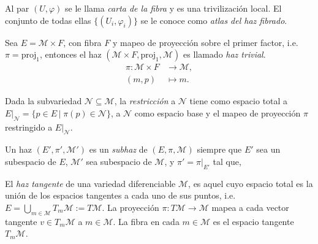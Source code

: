 \begin{mydef}  \cite{Baez}
Al par $(U, \varphi)$ se le llama \emph{carta de la fibra} y es una trivilizaci\'{o}n local. El conjunto de todas ellas $\{(U_{i}, \varphi_{i})\}$ se le conoce como \emph{atlas del haz fibrado}.
\end{mydef}

\begin{mydef}  \cite{Baez}
Sea $E=\mathcal{M} \times F$, con fibra $F$ y mapeo de proyecci\'{o}n sobre el primer factor, i.e. $\pi = \mathrm{proj}_{1}$, entonces el haz $(\mathcal{M} \times F, \mathrm{proj}_{1}, \mathcal{M})$ es llamado \emph{haz trivial}.
%
\begin{align*}
\pi: \mathcal{M} \times F & \longrightarrow \mathcal{M}, \\
(m, p) & \longmapsto m.
\end{align*}
%
\end{mydef}

\begin{mydef}[Restricci\'{o}n]  \cite{Baez}
Dada la subvariedad $\mathcal{N} \subseteq \mathcal{M}$, la \emph{restricci\'{o}n} a $\mathcal{N}$ tiene como espacio total a $E\vert_{\mathcal{N}} = \{p \in E \, \vert \; \pi(p) \in \mathcal{N}\}$, a $\mathcal{N}$ como espacio base y el mapeo de proyecci\'{o}n $\pi$ restringido a $E\vert_{\mathcal{N}}$.
\end{mydef}

\begin{mydef}  \cite{Baez}
Un haz $(E', \pi', \mathcal{M}')$ es un \emph{subhaz} de $(E, \pi, \mathcal{M})$ siempre que $E'$ sea un subespacio de $E$, $\mathcal{M}'$ sea subespacio de $\mathcal{M}$, y $\pi' = \pi\vert_{E'}$ tal que,
%
\begin{center}
\end{center}
%
\end{mydef}

\begin{ex}
El \emph{haz tangente} de una variedad diferenciable $\mathcal{M}$, es aquel cuyo espacio total es la uni\'{o}n de los espacios tangentes a cada uno de sus puntos, i.e. $E =  \bigcup\limits_{m \in \mathcal{M}} T_{m} \mathcal{M} := T \mathcal{M}$. La proyecci\'{o}n $\pi: T \mathcal{M} \longrightarrow \mathcal{M}$ mapea a cada vector tangente $v \in T_{m} \mathcal{M}$ a $m \in \mathcal{M}$. La fibra en cada $m \in \mathcal{M}$ es el espacio tangente $T_{m} \mathcal{M}$.
\end{ex}

